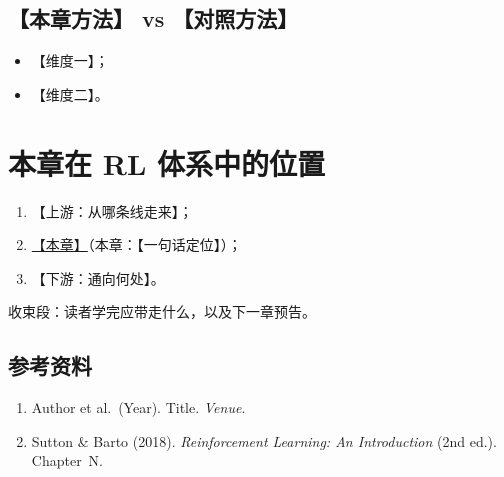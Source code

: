 \documentclass{article}
\begin{document}
\subsection*{【本章方法】 vs 【对照方法】}

\begin{itemize}
  \item 【维度一】；
  \item 【维度二】。
\end{itemize}

\section*{本章在 RL 体系中的位置}

\begin{enumerate}
  \item 【上游：从哪条线走来】；
  \item \underline{【本章】}（本章：【一句话定位】）；
  \item 【下游：通向何处】。
\end{enumerate}

收束段：读者学完应带走什么，以及下一章预告。

\subsection*{参考资料}

\begin{enumerate}
  \item Author et al.\ (Year). Title. \textit{Venue}.
  \item Sutton \& Barto (2018). \textit{Reinforcement Learning: An Introduction} (2nd ed.). Chapter~N.
\end{enumerate}
\end{document}
